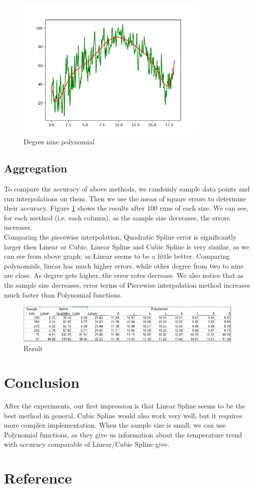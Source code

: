 \documentclass{article}
\begin{document}
\begin{figure}[H]
    \centering
    \includegraphics[height=200pt]{9poly_270.png}
    \caption{Degree nine polynomial}
\end{figure}

\subsection{Aggregation}
To compare the accuracy of above methods, we randomly sample data points and run interpolations on them. Then we use the mean of square errors to determine their accuracy. Figure \ref{aggregate} shows the results after 100 runs of each size. We can see, for each method (i.e. each column), as the sample size decreases, the errors increases. \\
Comparing the piecewise interpolation, Quadratic Spline error is significantly larger then Linear or Cubic. Linear Spline and Cubic Spline is very similar, as we can see from above graph; as Linear seems to be a little better. Comparing polynomials, linear has much higher errors, while other degree from two to nine are close. As degree gets higher, the error rates decrease. We also notice that as the sample size decreases, error terms of Piecewise interpolation method increases much faster than Polynomial functions.

\begin{figure}[H]
    \centering
    \includegraphics[width=500pt]{Capture}
    \caption{Result}
    \label{aggregate}
\end{figure}

\section{Conclusion}
After the experiments, our first impression is that Linear Spline seems to be the best method in general. Cubic Spline would also work very well, but it requires more complex implementation. When the sample size is small, we can use Polynomial functions, as they give us information about the temperature trend with accuracy comparable of Linear/Cubic Spline give.

\section{Reference}
\end{document}
